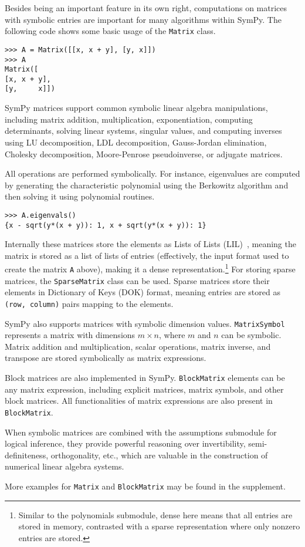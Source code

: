 Besides being an important feature in its own right, computations on
matrices with symbolic entries are important for many algorithms
within SymPy.  The following code shows some basic usage of the
\texttt{Matrix} class.
\begin{verbatim}
>>> A = Matrix([[x, x + y], [y, x]])
>>> A
Matrix([
[x, x + y],
[y,     x]])
\end{verbatim}

SymPy matrices support common symbolic linear algebra manipulations, including
matrix addition, multiplication, exponentiation, computing determinants,
solving linear systems, singular values, and computing inverses using LU
decomposition, LDL decomposition, Gauss-Jordan elimination, Cholesky
decomposition, Moore-Penrose pseudoinverse, or adjugate matrices.

All operations are performed symbolically. For instance, eigenvalues are computed
by generating the characteristic polynomial using the Berkowitz algorithm and
then solving it using polynomial routines.

\begin{verbatim}
>>> A.eigenvals()
{x - sqrt(y*(x + y)): 1, x + sqrt(y*(x + y)): 1}
\end{verbatim}

Internally these matrices store the elements as Lists of Lists (LIL)~\cite{scipy}, meaning
the matrix is stored as a list of lists of entries (effectively, the
input format used to create the matrix \texttt{A} above), making it a
dense representation.\footnote{Similar to the polynomials submodule, dense here
  means that all entries are stored in memory, contrasted with a sparse
  representation where only nonzero entries are stored.} For storing sparse
matrices, the \verb|SparseMatrix| class can be used. Sparse matrices store
their elements in Dictionary of Keys (DOK) format, meaning entries are stored
as \texttt{(row, column)} pairs mapping to the elements.

SymPy also supports matrices with symbolic dimension values. \verb|MatrixSymbol|
represents a matrix with dimensions $m\times n$, where $m$ and $n$ can be
symbolic. Matrix addition and multiplication, scalar operations, matrix inverse,
and transpose are stored symbolically as matrix expressions.

Block matrices are also implemented in SymPy. \verb|BlockMatrix| elements can
be any matrix expression, including explicit matrices, matrix symbols, and
other block matrices. All functionalities of matrix expressions are also
present in \verb|BlockMatrix|.

When symbolic matrices are combined with the assumptions submodule for logical
inference, they provide powerful reasoning over invertibility,
semi-definiteness, orthogonality, etc., which are valuable in the construction
of numerical linear algebra systems.

More examples for \verb|Matrix| and \verb|BlockMatrix| may be found in the
supplement.

